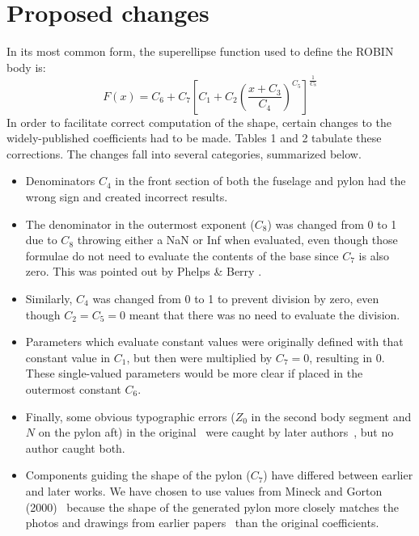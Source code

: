 \documentclass{ahs}
\begin{document}
\section{Proposed changes}
 In its most common form, the superellipse function used to define the ROBIN body is:
\begin{equation}
  F(x) = C_{6}+C_{7}\left[C_{1}+C_{2}\left(\frac{x+C_{3}}{C_{4}}\right)^{C_{5}}\right]^{\frac{1}{C_{8}}}
\end{equation}
In order to facilitate correct computation of the shape, certain changes to the
widely-published coefficients had to be made.
Tables 1 and 2 tabulate these corrections.
The changes fall into several categories, summarized below.
\begin{itemize}
\item Denominators $C_{4}$ in the front section of both the fuselage and pylon had the wrong sign
and created incorrect results.
\item The denominator in the outermost exponent ($C_{8}$) was changed from 0 to 1 due to $C_{8}$ throwing either a NaN or Inf when evaluated, even though those formulae do not need to evaluate the contents of the base since $C_{7}$ is also zero. This was pointed out by Phelps \& Berry \cite{nasa87762}.
\item Similarly, $C_{4}$ was changed from 0 to 1 to prevent division by zero, even though
$C_{2}=C_{5}=0$ meant that there was no need to evaluate the division.
\item Parameters which evaluate constant values were originally defined with that constant value in $C_{1}$, but then were multiplied by $C_{7}=0$, resulting in $0$.
These single-valued parameters would be more clear if placed in the outermost constant $C_{6}$.
\item Finally, some obvious typographic errors ($Z_0$ in the second body segment and $N$ on the pylon aft)
in the original~ were caught by later authors~, but no author caught both.
\item Components guiding the shape of the pylon ($C_{7}$) have differed
between earlier and later works. We have chosen to use values from Mineck and Gorton (2000)~ because the shape of the generated 
pylon more closely matches the photos and drawings from earlier papers~ than the original coefficients.
\end{itemize}
\end{document}

